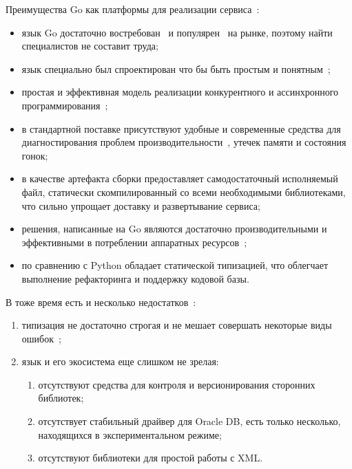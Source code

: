 Преимущества Go как платформы для реализации сервиса~\cite{the-pros-and-cons-of-programming-in-go}:
\begin{itemize}
    \item язык Go достаточно востребован~\cite{mostpopularlang2018,itsalaryinmid2018}
    и популярен~\cite{TIOBEIndex}
    на рынке, поэтому найти специалистов не составит труда;
    \item язык специально был спроектирован что бы быть простым и понятным~\cite{Gogoodbadugly,advpropsGo,WhyGosdesignisadisservicetointelligentprogrammers};
    \item простая и эффективная модель реализации конкурентного и ассинхронного программирования~\cite{hoar1989csp};
    \item в стандартной поставке присутствуют удобные и современные средства для диагностирования проблем производительности~\cite{ProfilingGoPrograms,profilingandoptimizationGo},
    утечек памяти и состояния гонок;
    \item в качестве артефакта сборки предоставляет самодостаточный исполняемый файл,
    статически скомпилированный со всеми необходимыми библиотеками,
    что сильно упрощает доставку и развертывание сервиса;
    \item решения, написанные на Go являются достаточно производительными и эффективными в потреблении аппаратных ресурсов~\cite{HowWeWentfrom30Serversto2Go,millionWebSocketGo,Goinyandex};
    \item по сравнению с Python обладает статической типизацией, что облегчает выполнение рефакторинга и поддержку кодовой базы.
\end{itemize}

В тоже время есть и несколько недостатков~\cite{Gogoodbadugly,50ShadesofGo}:
\begin{enumerate}
    \item типизация не достаточно строгая и не мешает совершать некоторые виды ошибок~\cite{staticlinterGo};
    \item язык и его экосистема еще слишком не зрелая:
    \begin{enumerate}
        \item отсутствуют средства для контроля и версионирования сторонних библиотек;
        \item отсутствует стабильный драйвер для Oracle DB, есть только несколько, находящихся в экспериментальном режиме;
        \item отсутствуют библиотеки для простой работы с XML\@.
    \end{enumerate}
\end{enumerate}

